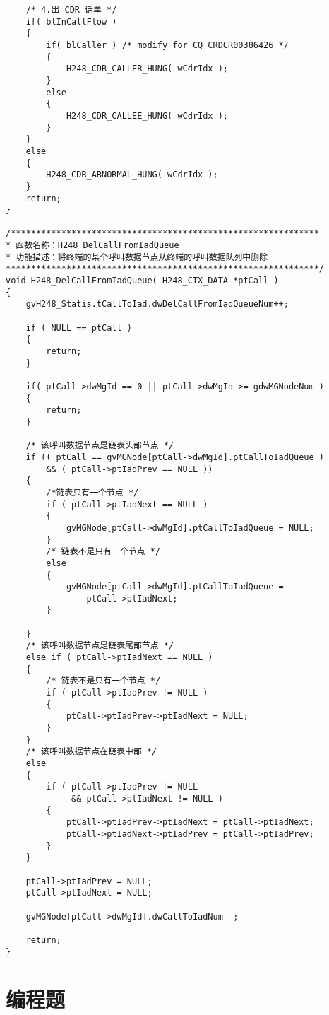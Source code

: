 ﻿\documentclass  [11pt,onecolumn]{article}
\begin{document}
\begin{lstlisting}
    /* 4.出 CDR 话单 */
    if( blInCallFlow )
    {
        if( blCaller ) /* modify for CQ CRDCR00386426 */
        {
            H248_CDR_CALLER_HUNG( wCdrIdx );    
        }
        else
        {   
            H248_CDR_CALLEE_HUNG( wCdrIdx );    
        }
    }
    else
    {
        H248_CDR_ABNORMAL_HUNG( wCdrIdx );    
    }
    return;
}

/*************************************************************
* 函数名称：H248_DelCallFromIadQueue
* 功能描述：将终端的某个呼叫数据节点从终端的呼叫数据队列中删除
**************************************************************/
void H248_DelCallFromIadQueue( H248_CTX_DATA *ptCall )
{    
    gvH248_Statis.tCallToIad.dwDelCallFromIadQueueNum++;
    
    if ( NULL == ptCall )
    {
        return;
    }

    if( ptCall->dwMgId == 0 || ptCall->dwMgId >= gdwMGNodeNum )
    {
        return;
    }
    
    /* 该呼叫数据节点是链表头部节点 */
    if (( ptCall == gvMGNode[ptCall->dwMgId].ptCallToIadQueue )
        && ( ptCall->ptIadPrev == NULL ))
    {
        /*链表只有一个节点 */
        if ( ptCall->ptIadNext == NULL )
        {
            gvMGNode[ptCall->dwMgId].ptCallToIadQueue = NULL;
        }   
        /* 链表不是只有一个节点 */
        else 
        {
            gvMGNode[ptCall->dwMgId].ptCallToIadQueue =
                ptCall->ptIadNext;
        }

    }
    /* 该呼叫数据节点是链表尾部节点 */
    else if ( ptCall->ptIadNext == NULL )
    {
        /* 链表不是只有一个节点 */
        if ( ptCall->ptIadPrev != NULL )
        {
            ptCall->ptIadPrev->ptIadNext = NULL;
        }
    }
    /* 该呼叫数据节点在链表中部 */
    else
    {       
        if ( ptCall->ptIadPrev != NULL
             && ptCall->ptIadNext != NULL )
        {
            ptCall->ptIadPrev->ptIadNext = ptCall->ptIadNext;    
            ptCall->ptIadNext->ptIadPrev = ptCall->ptIadPrev;    
        }    
    }

    ptCall->ptIadPrev = NULL;
    ptCall->ptIadNext = NULL;

    gvMGNode[ptCall->dwMgId].dwCallToIadNum--;

    return;
}
\end{lstlisting}


\pagebreak
\section{编程题}
\end{document}
